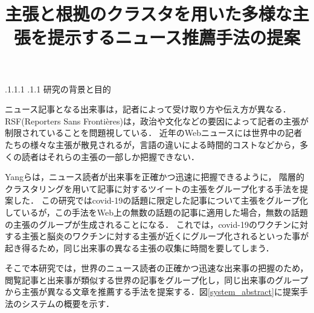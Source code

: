 \documentclass[a4paper, twocolumn, 10pt]{jarticle}
\makeatletter
\def\section{%
	\@startsection{section}{1}{\z@}%
	{.1\Cvs \@plus.1\Cdp \@minus.1\Cdp}%
	{.1\Cvs \@plus.1\Cdp}%
	{\normalfont\normalsize\bfseries}%
}
\makeatother
\begin{document}
\title{主張と根拠のクラスタを用いた多様な主張を提示するニュース推薦手法の提案}

\maketitle

\thispagestyle{empty}

\section{研究の背景と目的}

ニュース記事となる出来事は，記者によって受け取り方や伝え方が異なる．
RSF(Reporters Sans Frontières)は，政治や文化などの要因によって記者の主張が制限されていることを問題視している\cite{2021_world_press_freedom_index}．
近年のWebニュースには世界中の記者たちの様々な主張が散見されるが，言語の違いによる時間的コストなどから，多くの読者はそれらの主張の一部しか把握できない．

Yangらは，ニュース読者が出来事を正確かつ迅速に把握できるように，
階層的クラスタリングを用いて記事に対するツイートの主張をグループ化する手法を提案した\cite{yang_scalable_2021}．
この研究ではcovid-19の話題に限定した記事について主張をグループ化しているが，この手法をWeb上の無数の話題の記事に適用した場合，無数の話題の主張のグループが生成されることになる．
これでは，covid-19のワクチンに対する主張と脳炎のワクチンに対する主張が近くにグループ化されるといった事が起き得るため，同じ出来事の異なる主張の収集に時間を要してしまう．





そこで本研究では，世界のニュース読者の正確かつ迅速な出来事の把握のため，閲覧記事と出来事が類似する世界の記事をグループ化し，同じ出来事のグループから主張が異なる文章を推薦する手法を提案する．図\ref{system_abstract}に提案手法のシステムの概要を示す．
\end{document}
